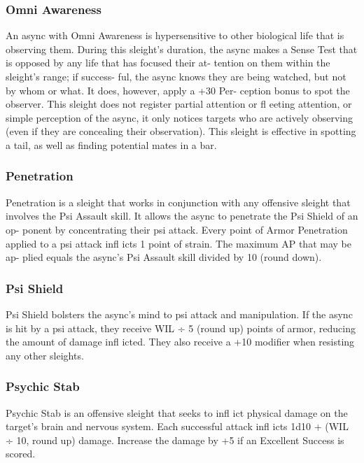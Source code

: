\subsubsection{Omni Awareness}

An async with Omni Awareness is hypersensitive to 
other biological life that is observing them. During 
this sleight's duration, the async makes a Sense Test 
that is opposed by any life that has focused their at-
tention on them within the sleight's range; if success-
ful, the async knows they are being watched, but not 
by whom or what. It does, however, apply a +30 Per-
ception bonus to spot the observer. This sleight does 
not register partial attention or fl eeting attention, or 
simple perception of the async, it only notices targets 
who are actively observing (even if they are concealing 
their observation). This sleight is effective in spotting a 
tail, as well as finding potential mates in a bar.

\subsubsection{Penetration}

Penetration is a sleight that works in conjunction with 
any offensive sleight that involves the Psi Assault skill. 
It allows the async to penetrate the Psi Shield of an op-
ponent by concentrating their psi attack. Every point 
of Armor Penetration applied to a psi attack infl icts 
1 point of strain. The maximum AP that may be ap-
plied equals the async's Psi Assault skill divided by 10 
(round down).

\subsubsection{Psi Shield}

Psi Shield bolsters the async's mind to psi attack and 
manipulation. If the async is hit by a psi attack, they 
receive WIL ÷ 5 (round up) points of armor, reducing 
the amount of damage infl icted. They also receive a 
+10 modifier when resisting any other sleights.

\subsubsection{Psychic Stab}

Psychic Stab is an offensive sleight that seeks to infl ict 
physical damage on the target's brain and nervous 
system. Each successful attack infl icts 1d10 + (WIL ÷ 
10, round up) damage. Increase the damage by +5 if 
an Excellent Success is scored.

